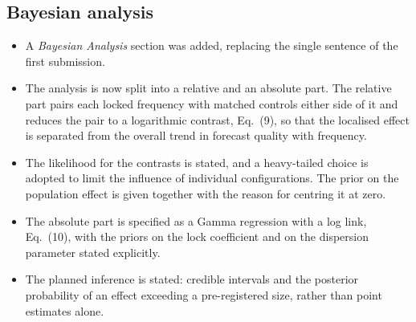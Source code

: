 \subsection{Bayesian analysis}
\begin{itemize}
  \item A \emph{Bayesian Analysis} section was added, replacing the single
        sentence of the first submission.
  \item The analysis is now split into a relative and an absolute part. The
        relative part pairs each locked frequency with matched controls either
        side of it and reduces the pair to a logarithmic contrast, Eq.~(9), so
        that the localised effect is separated from the overall trend in
        forecast quality with frequency.
  \item The likelihood for the contrasts is stated, and a heavy-tailed choice
        is adopted to limit the influence of individual configurations. The
        prior on the population effect is given together with the reason for
        centring it at zero.
  \item The absolute part is specified as a Gamma regression with a log link,
        Eq.~(10), with the priors on the lock coefficient and on the dispersion
        parameter stated explicitly.
  \item The planned inference is stated: credible intervals and the posterior
        probability of an effect exceeding a pre-registered size, rather than
        point estimates alone.
\end{itemize}